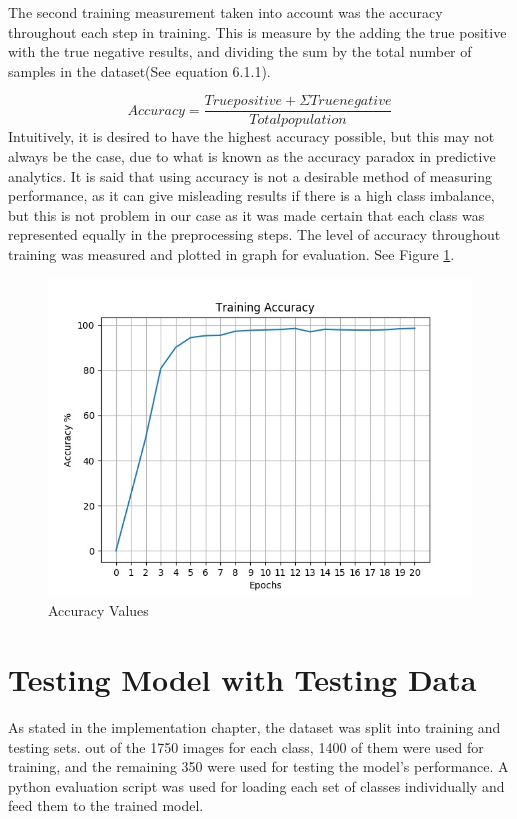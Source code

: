 \newpage

The second training measurement taken into account was the accuracy throughout each step in training. This is measure by the adding the true positive with the true negative results, and dividing the sum by the total number of samples in the dataset(See equation 6.1.1).


\begin{equation}\label{eq:ac}
Accuracy = 
\frac{
	True positive + Σ True negative
}{
	Total population
}
\end{equation}
Intuitively, it is desired to have the highest accuracy possible, but this may not always be the case, due to what is known as the accuracy paradox in predictive analytics. It is said that using accuracy is not a desirable method of measuring performance, as it can give misleading results if there is a high class imbalance, but this is not problem in our case as it was made certain that each class was represented equally in the preprocessing steps.  The level of accuracy throughout training was measured and plotted in graph for evaluation. See Figure \ref{acc}.

\begin{figure}[ht]
	\begin{center}
		\advance\leftskip-3cm
		\advance\rightskip-3cm
		\includegraphics[keepaspectratio=true,scale=0.7]{__resources/Results/accuracy.jpg}
		\caption{Accuracy Values}
		\label{acc}
	\end{center}
\end{figure}

\newpage

\section{Testing Model with Testing Data}
As stated in the implementation chapter, the dataset was split into training and testing sets. out of the 1750 images for each class, 1400 of them were used for training, and the remaining 350 were used for testing the model's performance. A python evaluation script was used for loading each set of classes individually and feed them to the trained model. 

